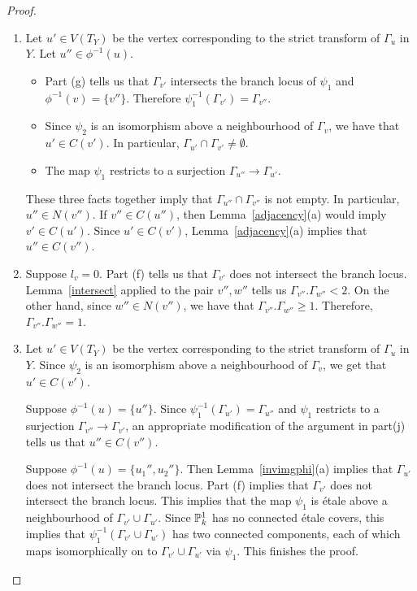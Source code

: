 \begin{proof}
\begin{enumerate}[\upshape (a)]
   \item Let $u' \in V(T_Y)$ be the vertex corresponding to the strict transform of $\Gamma_u$ in $Y$. Let $u'' \in \phi^{-1}(u)$.
   \begin{itemize}
    \item Part (g) tells us that $\Gamma_{v'}$ intersects the branch locus of $\psi_1$ and $\phi^{-1}(v) = \{ v'' \}$. Therefore $\psi_1^{-1}(\Gamma_{v'}) = \Gamma_{v''}$.
    \item Since $\psi_2$ is an isomorphism above a neighbourhood of $\Gamma_v$, we have that $u' \in C(v')$. In particular, $\Gamma_{u'} \cap \Gamma_{v'} \neq \emptyset$.
    \item The map $\psi_1$ restricts to a surjection $\Gamma_{u''} \rightarrow \Gamma_{u'}$.
   \end{itemize}
    These three facts together imply that $\Gamma_{u''} \cap \Gamma_{v''}$ is not empty. In particular,  $u'' \in N(v'')$. If $v'' \in C(u'')$, then Lemma~\ref{adjacency}(a) would imply $v' \in C(u')$.  Since $u' \in C(v')$, Lemma~\ref{adjacency}(a) implies that $u'' \in C(v'')$.  
  
  \item Suppose $l_v = 0$. Part (f) tells us that $\Gamma_{v'}$ does not intersect the branch locus. Lemma~\ref{intersect} applied to the pair $v'',w''$ tells us $\Gamma_{v''}.\Gamma_{w''} < 2$. On the other hand, since $w'' \in N(v'')$, we have that $\Gamma_{v''}.\Gamma_{w''} \geq 1$. Therefore,  $\Gamma_{v''}.\Gamma_{w''} = 1$.
  
  \item Let $u' \in V(T_Y)$ be the vertex corresponding to the strict transform of $\Gamma_u$ in $Y$. Since $\psi_2$ is an isomorphism above a neighbourhood of $\Gamma_v$, we get that $u' \in C(v')$.  
  
  Suppose $\phi^{-1}(u) = \{ u'' \}$. Since $\psi_1^{-1}(\Gamma_{u'}) = \Gamma_{u''}$ and $\psi_1$ restricts to a surjection $\Gamma_{v''} \rightarrow \Gamma_{v'}$, an appropriate modification of the argument in part(j) tells us that $u'' \in C(v'')$.
  
  Suppose $\phi^{-1}(u) = \{ u_1'',u_2'' \}$. Then Lemma~\ref{invimgphi}(a) implies that $\Gamma_{u'}$ does not intersect the branch locus. Part (f) implies that $\Gamma_{v'}$ does not intersect the branch locus. This implies that the map $\psi_1$ is \'{e}tale above a neighbourhood of $\Gamma_{v'} \cup \Gamma_{u'}$. Since $\P^1_k$ has no connected \'{e}tale covers, this implies that $\psi_1^{-1}(\Gamma_{v'} \cup \Gamma_{u'})$ has two connected components, each of which maps isomorphically on to $\Gamma_{v'} \cup \Gamma_{u'}$ via $\psi_1$. This finishes the proof.  \qedhere
 \end{enumerate}
\end{proof}

